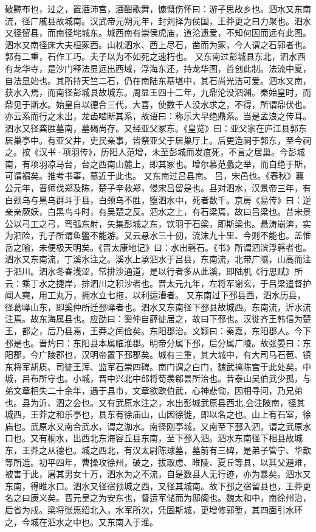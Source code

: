 \documentclass[12pt,UTF8]{ctexbook}
\begin{document}
破黥布也，过之，置酒沛宫，酒酣歌舞，慷慨伤怀曰：游子思故乡也。泗水又东南流，径广戚县故城南。汉武帝元朔元年，封刘择为侯国，王莽更之曰力聚也。泗水又径留县，而南径垞城东。城西南有崇侯虎庙，道沦遗爱，不知何因而远有此图。泗水又南径床大夫桓冢西。山枕泗水、西上尽石，凿而为冢，今人谓之石郭者也。郭有二重，石作工巧。夫子以为不如死之速朽也。
又东南过彭城县东北，泗水西有龙华寺，是沙门释法显远出西域，浮海东还，持龙华图，首创此制。法流中夏，自法显始也。其所持天竺二石，仍在南陆东基堪中，其石尚光洁可爱。泗水又南，获水入焉，而南径彭城县故城东。周显王四十二年，九鼎沦没泗渊。秦始皇时，而鼎见于斯水。始皇自以德合三代，大喜，使数千人没水求之，不得，所谓鼎伏也。亦云系而行之未出，龙齿啮断其系，故语曰：称乐大早绝鼎系。当是孟浪之传耳。泗水又径龚胜墓南，墓碣尚存。又经亚父冢东。《皇览》曰：亚父家在庐江县郭东居巢亭中。有亚父井，吏民亲事，皆祭亚父于居巢厅上。后更造祠于郭东，至今祠之。按《汉书·项羽传》，历阳人范增，未至彭城而发疽死，不言之居巢。今彭城南，有项羽凉马台，台之西南山麓上，即其冢也。增尔慕范蠡之举，而自绝于斯，可谓褊矣。推考书事，墓近于此也。
又东南过吕县南。
吕，宋邑也。《春秋》襄公元年，晋师伐郑及陈，楚子辛救郑，侵宋吕留是也。县对泗水，汉景帝三年，有白颈乌与黑乌群斗于县，白颈乌不胜，堕泗水中，死者数千。京房《易传》曰：逆亲亲厥妖，白黑鸟斗时，有吴楚之反。泗水之上，有石梁焉，故曰吕梁也。昔宋景公以弓工之弓，弯弧东射，矢集彭城之东，饮羽于石梁，即斯梁也。悬涛崩渀，实为泗险，孔子所谓鱼鳖不能游。又云悬水三十仞，流沫九十里、今则不能也。盖惟岳之喻，未便极天明矣。《晋太康地记》曰：水出磬石。《书》所谓泗滨浮磬者也。泗水又东南流，丁溪水注之。溪水上承泗水于吕县，东南流，北带广隰，山高而注于泗川。泗水冬春浅涩，常排沙通道，是以行者多从此溪，即陆机《行思赋》所云：乘丁水之捷岸，排泗川之积沙者也。晋太元九年，左将军谢玄，于吕梁遣督护闻人奭，用工丸万，拥水立七拖，以利运漕者。
又东南过下邳县西，泗水历县，径葛峄山东，即奚仲所迁邳峄者也。泗水又东南径下邳县故城西。东南流，沂水流注焉。故东海属县也。应劭曰：奚仲自薛徙居之，故曰下邳也。汉徙齐王韩信为楚王，都之，后乃县焉，王莽之闰俭矣。东阳郡治。文颖曰：秦嘉，东阳郡人。今下邳是也。晋灼曰：东阳县本属临淮郡。明帝分属下邳，后分属广陵。故张晏曰：东阳郡，今广陵郡也，汉明帝置下邳郡矣。城有三重，其大城中，有大司马石苞、镇东将军胡质、司徒王浑、监军石崇四碑。南门谓之白门，魏武擒陈宫于此处矣。中城，吕布所守也。小城，晋中兴北中郎将荀羡郗昙所治也。昔泰山吴伯武少孤，与弟文章相失二十余年，遇于县市，文章欲欧伯武，心神悲恸，因相寻问，乃兄弟也。县为沂、泗之会也。又有武原水注之，水出彭城武原县西北.会注陂南，径其城西，王莽之和乐亭也，县东有徐庙山，山因徐徙，即以名之也。山上有石室，徐庙也。武原水又南合武水，谓之泇水。南径刚亭城，又南至下邳入泗，谓之武原水口也。又有桐水，出西北东海容丘县东南，至下邳入泗。泗水东南径下相县故城东，王莽之从德也。城之西北，有汉太尉陈球墓，墓前有三碑，是弟子管宁、华歆等所造。初平四年，曹操攻徐州，破之，拔取虑、睢陵、夏丘等县，以其父避难，被害于此，屠其男女十万，泗水为之不流，自是数县人无行迹，亦为暴矣。泗水又东南，得睢水口。泗水又径宿预城之西，又径其城南。故下邳之宿留县也，王莽更名之曰康义矣。晋元皇之为安东也，督运军储而为邸阁也。魏太和中，南徐州治，后省为戍。梁将张惠绍北入，水军所次，凭固斯城，更增修郭堑，其四面引水环之，今城在泗水之中也。又东南入于淮。
\end{document}
